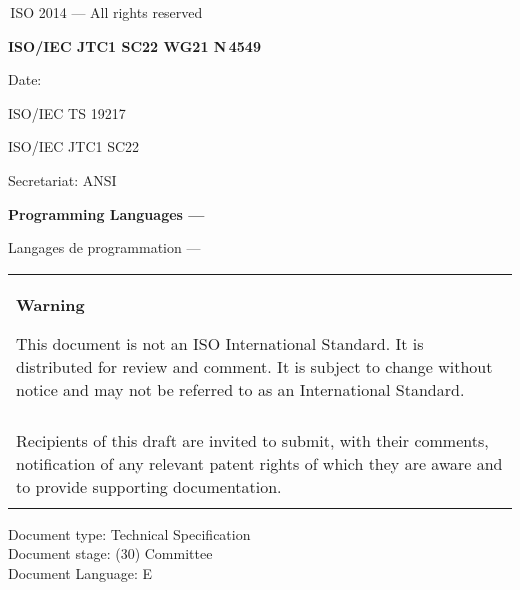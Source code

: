 

\thispagestyle{empty}
{\raisebox{.35ex}{\smaller\copyright}}\,ISO 2014 --- All rights reserved
\vspace{2ex}

\begin{flushright}
\textbf{ISO/IEC JTC1 SC22 WG21 N\,\LARGE4549}

Date: \reldate

ISO/IEC TS 19217

ISO/IEC JTC1 SC22

Secretariat: ANSI

\end{flushright}

\vfill

\textbf{\LARGE Programming Languages --- \doctitle}

Langages de programmation --- \frtitle

\vfill

\begin{tabular}{|p{\hsize}|}
\hline
\begin{center}
\textbf{Warning}
\end{center}

\vspace{2ex}

This document is not an ISO International Standard. It is distributed
for review and comment. It is subject to change without notice and may
not be referred to as an International Standard.\\\\

Recipients of this draft are invited to submit, with their comments,
notification of any relevant patent rights of which they are aware
and to provide supporting documentation.\\\\
\hline
\end{tabular}

\vfill
\noindent
Document type: Technical Specification\\
Document stage: (30) Committee\\
Document Language: E
\pagebreak

\thispagestyle{cpppage}

